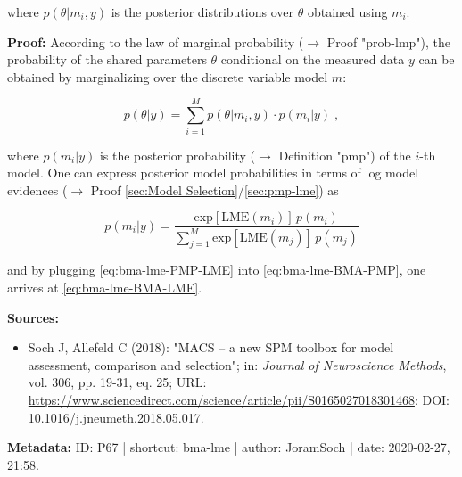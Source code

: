 \documentclass[a4paper,12pt]{book}
\begin{document}
where $p(\theta \vert m_i,y)$ is the posterior distributions over $\theta$ obtained using $m_i$.


\vspace{1em}
\textbf{Proof:} According to the law of marginal probability ($\rightarrow$ Proof "prob-lmp"), the probability of the shared parameters $\theta$ conditional on the measured data $y$ can be obtained by marginalizing over the discrete variable model $m$:

\begin{equation} \label{eq:bma-lme-BMA-PMP}
p(\theta|y) = \sum_{i=1}^{M} p(\theta|m_i,y) \cdot p(m_i|y) \; ,
\end{equation}

where $p(m_i \vert y)$ is the posterior probability ($\rightarrow$ Definition "pmp") of the $i$-th model. One can express posterior model probabilities in terms of log model evidences ($\rightarrow$ Proof \ref{sec:Model Selection}/\ref{sec:pmp-lme}) as

\begin{equation} \label{eq:bma-lme-PMP-LME}
p(m_i|y) = \frac{\mathrm{exp}[\mathrm{LME}(m_i)] \, p(m_i)}{\sum_{j=1}^{M} \mathrm{exp}[\mathrm{LME}(m_j)] \, p(m_j)}
\end{equation}

and by plugging \eqref{eq:bma-lme-PMP-LME} into \eqref{eq:bma-lme-BMA-PMP}, one arrives at \eqref{eq:bma-lme-BMA-LME}.

\vspace{1em}
\textbf{Sources:}
\begin{itemize}
\item Soch J, Allefeld C (2018): "MACS – a new SPM toolbox for model assessment, comparison and selection"; in: \textit{Journal of Neuroscience Methods}, vol. 306, pp. 19-31, eq. 25; URL: \url{https://www.sciencedirect.com/science/article/pii/S0165027018301468}; DOI: 10.1016/j.jneumeth.2018.05.017.
\end{itemize}


\vspace{1em}
\textbf{Metadata:} ID: P67 | shortcut: bma-lme | author: JoramSoch | date: 2020-02-27, 21:58.
\end{document}

